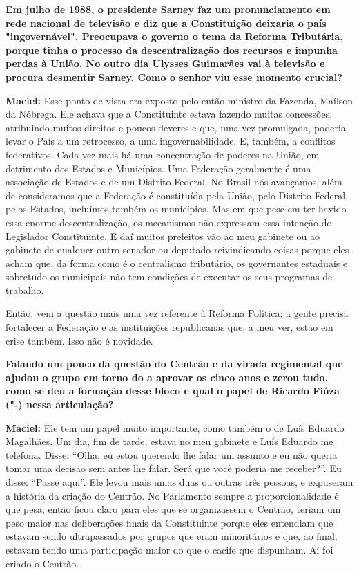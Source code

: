 \textbf{Em julho de 1988, o presidente Sarney faz um pronunciamento em
rede nacional de televisão e diz que a Constituição deixaria o país
"ingovernável". Preocupava o governo o tema da Reforma Tributária,
porque tinha o processo da descentralização dos recursos e impunha
perdas à União. No outro dia Ulysses Guimarães vai à televisão e procura
desmentir Sarney. Como o senhor viu esse momento crucial? }

\textbf{Maciel:} Esse ponto de vista era exposto pelo então ministro da
Fazenda, Maílson da Nóbrega. Ele achava que a Constituinte estava
fazendo muitas concessões, atribuindo muitos direitos e poucos deveres e
que, uma vez promulgada, poderia levar o País a um retrocesso, a uma
ingovernabilidade. E, também, a conflitos federativos. Cada vez mais há
uma concentração de poderes na União, em detrimento dos Estados e
Municípios. Uma Federação geralmente é uma associação de Estados e de um
Distrito Federal. No Brasil nós avançamos, além de consideramos que a
Federação é constituída pela União, pelo Distrito Federal, pelos
Estados, incluímos também os municípios. Mas em que pese em ter havido
essa enorme descentralização, os mecanismos não expressam essa intenção
do Legislador Constituinte. E daí muitos prefeitos vão ao meu gabinete
ou ao gabinete de qualquer outro senador ou deputado reivindicando
coisas porque eles acham que, da forma como é o centralismo tributário,
os governantes estaduais e sobretudo os municipais não tem condições de
executar os seus programas de trabalho.

Então, vem a questão mais uma vez referente à Reforma Política: a gente
precisa fortalecer a Federação e as instituições republicanas que, a meu
ver, estão em crise também. Isso não é novidade.

\textbf{Falando um pouco da questão do Centrão e da virada regimental
que ajudou o grupo em torno do  a aprovar os cinco anos e zerou tudo,
como se deu a formação desse bloco e qual o papel de Ricardo Fiúza
("-) nessa articulação? }

\textbf{Maciel:} Ele tem um papel muito importante, como também o de
Luís Eduardo Magalhães. Um dia, fim de tarde, estava no meu gabinete e
Luís Eduardo me telefona. Disse: ``Olha, eu estou querendo lhe falar um
assunto e eu não queria tomar uma decisão sem antes lhe falar. Será que
você poderia me receber?''. Eu disse: ``Passe aqui''. Ele levou mais
umas duas ou outras três pessoas, e expuseram a história da criação do
Centrão. No Parlamento sempre a proporcionalidade é que pesa, então
ficou claro para eles que se organizassem o Centrão, teriam um peso
maior nas deliberações finais da Constituinte porque eles entendiam que
estavam sendo ultrapassados por grupos que eram minoritários e que, ao
final, estavam tendo uma participação maior do que o cacife que
dispunham. Aí foi criado o Centrão.

